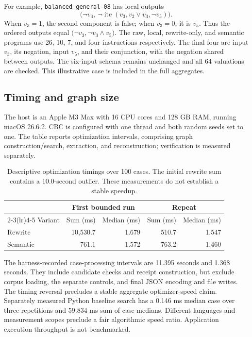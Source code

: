 \documentclass[11pt]{article}
\begin{document}
For example, \texttt{balanced\_general-08} has local outputs
\[
  \bigl(\neg v_3,\
    \neg\operatorname{ite}(v_3,v_2\lor v_3,\neg v_5)\bigr).
\]
When $v_3=1$, the second component is false; when $v_3=0$, it is $v_5$.
Thus the ordered outputs equal
$\bigl(\neg v_3,\neg v_3\land v_5\bigr)$.
The raw, local, rewrite-only, and semantic programs use 26, 10, 7, and four
instructions respectively. The final four are input $v_3$, its negation,
input $v_5$, and their conjunction, with the negation shared between outputs.
The six-input schema remains unchanged and all 64 valuations are checked.
This illustrative case is included in the full aggregates.

\subsection{Timing and graph size}

The host is an Apple M3 Max with 16 CPU cores and 128 GB RAM, running
macOS 26.6.2. CBC is configured with one thread and both random seeds set to one.
The table reports optimization intervals, comprising graph construction/search,
extraction, and reconstruction; verification is measured separately.

\begin{table}[ht]
\centering
\begin{tabular}{lrrrr}
\toprule
 & \multicolumn{2}{c}{First bounded run} &
   \multicolumn{2}{c}{Repeat}\\
\cmidrule(lr){2-3}\cmidrule(lr){4-5}
Variant & Sum (ms) & Median (ms) & Sum (ms) & Median (ms)\\
\midrule
Rewrite & 10,530.7 & 1.679 & 510.7 & 1.547\\
Semantic & 761.1 & 1.572 & 763.2 & 1.460\\
\bottomrule
\end{tabular}
\caption{Descriptive optimization timings over 100 cases. The initial rewrite
sum contains a 10.0-second outlier. These measurements do not establish a
stable speedup.}
\label{tab:timing}
\end{table}

The harness-recorded case-processing intervals are 11.395 seconds and
1.368 seconds. They include candidate checks and receipt construction, but
exclude corpus loading, the separate controls, and final JSON encoding and
file writes. The timing reversal precludes a stable
aggregate optimizer-speed claim. Separately measured Python baseline search
has a 0.146 ms median case over three repetitions and 59.834 ms sum of case
medians. Different languages and measurement scopes preclude a fair
algorithmic speed ratio. Application execution throughput is not benchmarked.
\end{document}
